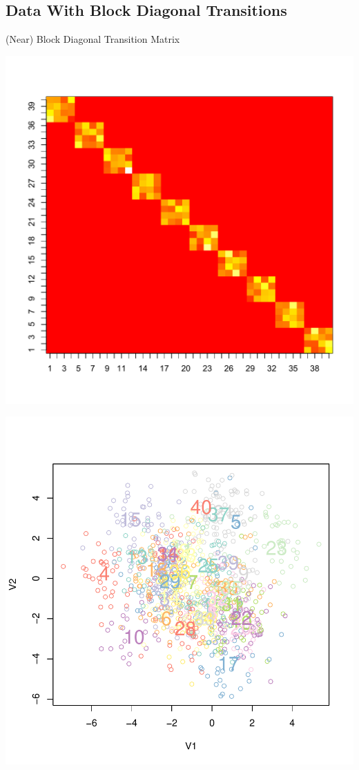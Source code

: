 \documentclass[11pt, mathserif, handout, table]{beamer}
\begin{document}
\subsection{Data With Block Diagonal Transitions}
\begin{frame}{(Near) Block Diagonal Transition Matrix}
\label{sec:block-diag-trans}
\begin{minipage}{0.45\textwidth}
\begin{center}
\includegraphics[width=\textwidth]{img/block_diag/A_gt_10x4}
\end{center}
\end{minipage}
\hspace{0.1in}
\begin{minipage}{0.45\textwidth}
\begin{center}
\includegraphics[width=\textwidth]{img/block_diag/10x4_gty}

\end{center}
\end{minipage}
\end{frame}
\end{document}
